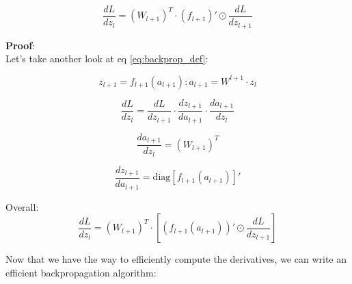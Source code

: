 \begin{mdframed}[backgroundcolor=blue_background, linecolor=black, linewidth=2pt, frametitle=\textbf{Lemma}]
\begin{center}
\begin{equation} \label{lemma:simple_partial_derivative}
    \frac{dL}{dz_l} = (W_{l+1})^T \cdot (f_{l+1})' \odot \frac{dL}{dz_{l+1}}
\end{equation}
\end{center}
\end{mdframed}

\textbf{Proof}: \\
Let's take another look at eq \ref{eq:backprop_def}:

\begin{equation}
    z_{l+1} = f_{l+1}(a_{l+1}) \colon a_{l+1} = W^{l+1} \cdot z_l
\end{equation}

\begin{equation}
    \frac{dL}{dz_l} = \frac{dL}{dz_{l+1}} \cdot \frac{dz_{l+1}}{da_{l+1}} \cdot \frac{da_{l+1}}{dz_l}
\end{equation}

\begin{equation}
    \frac{da_{l+1}}{dz_l} = (W_{l+1})^T
\end{equation}

\begin{equation}
    \frac{dz_{l+1}}{da_{l+1}} = \text{diag}[f_{l+1}(a_{l+1})]'
\end{equation}

Overall:
\begin{equation}
    \frac{dL}{dz_l} = (W_{l+1})^T \cdot [(f_{l+1}(a_{l+1}))' \odot \frac{dL}{dz_{l+1}}]
\end{equation}

Now that we have the way to efficiently compute the derivatives, we can write an efficient backpropagation algorithm:


